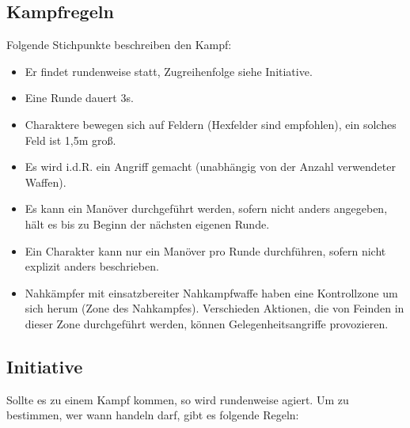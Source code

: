 \documentclass{article}
\begin{document}
\begin{center}
\subsection{Kampfregeln}
\end{center}

Folgende Stichpunkte beschreiben den Kampf:

\begin{itemize}
\item Er findet rundenweise statt, Zugreihenfolge siehe Initiative.
\item Eine Runde dauert 3s.
\item Charaktere bewegen sich auf Feldern (Hexfelder sind empfohlen), ein solches Feld ist 1,5m groß.
\item Es wird i.d.R. ein Angriff gemacht (unabhängig von der Anzahl verwendeter Waffen).
\item Es kann ein Manöver durchgeführt werden, sofern nicht anders angegeben, hält es bis zu Beginn der nächsten eigenen Runde.
\item Ein Charakter kann nur ein Manöver pro Runde durchführen, sofern nicht explizit anders beschrieben.
\item Nahkämpfer mit einsatzbereiter Nahkampfwaffe haben eine Kontrollzone um sich herum (Zone des Nahkampfes). Verschieden Aktionen, die von Feinden in dieser Zone durchgeführt werden, können Gelegenheitsangriffe provozieren.
\end{itemize}

\begin{center}
\subsection{Initiative}
\end{center}

Sollte es zu einem Kampf kommen, so wird rundenweise agiert. Um zu bestimmen, wer wann handeln darf, gibt es folgende
Regeln:
\end{document}
